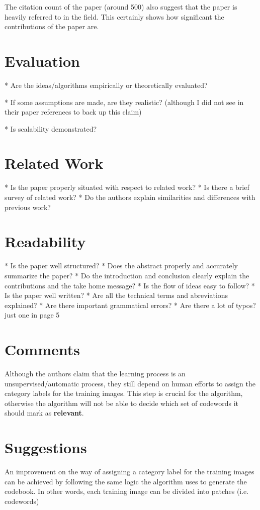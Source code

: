 \documentclass[11pt,a4paper]{article}
\begin{document}
The citation count of the paper (around 500) also suggest that the paper is heavily referred to in the field. This certainly shows how significant the
contributions of the paper are.

\section{Evaluation}
* Are the ideas/algorithms empirically or theoretically evaluated?

* If some assumptions are made, are they realistic?
 (although I did not see in their paper referenecs to back up this claim)

* Is scalability demonstrated?

\section{Related Work}
* Is the paper properly situated with respect to related work?
* Is there a brief survey of related work?
* Do the authors explain similarities and differences with previous work?

\section{Readability}
* Is the paper well structured?
    * Does the abstract properly and accurately summarize the paper?
    * Do the introduction and conclusion clearly explain the contributions and the take home message?
    * Is the flow of ideas easy to follow?
* Is the paper well written?
    * Are all the technical terms and abreviations explained?
    * Are there important grammatical errors?
    * Are there a lot of typos? just one in page 5

\section{Comments}
Although the authors claim that the learning process is an unsupervised/automatic process, they still depend on human efforts to assign the category labels for
the training images. This step is crucial for the algorithm, otherwise the algorithm will not be able to decide which set of codewords it should mark as
\textbf{relevant}.

\section{Suggestions}
An improvement on the way of assigning a category label for the training images can be achieved by following the same logic the algorithm uses to generate the
codebook. In other words, each training image can be divided into patches (i.e. codewords)



\nocite{*}

\end{document}
